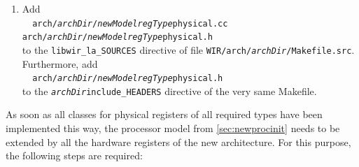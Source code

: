 \begin{enumerate}[resume]
  \item Add \\
  \verb|  arch/|\texttt{\itshape archDir}\verb|/|\texttt{\itshape newModelregType}\verb|physical.cc arch/|\texttt{\itshape archDir}\verb|/|\texttt{\itshape newModelregType}\verb|physical.h| \\
  to the \texttt{libwir\_la\_SOURCES} directive of file \texttt{WIR/arch/{\itshape archDir}/Makefile.src}.
  Furthermore, add \\
  \verb|  arch/|\texttt{\itshape archDir}\verb|/|\texttt{\itshape newModelregType}\verb|physical.h| \\
  to the \texttt{{\itshape archDir}include\_HEADERS} directive of the very same Makefile.
\end{enumerate}

As soon as all classes for physical registers of all required types have been implemented this way, the processor model from \cref{sec:newprocinit} needs to be extended by all the hardware registers of the new architecture.
For this purpose, the following steps are required:

